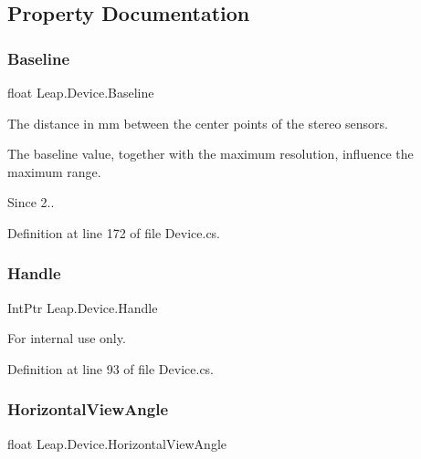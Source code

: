 \subsection{Property Documentation}
\mbox{\label{class_leap_1_1_device_a94d74a3c07a217a1aca1e4c88852f546}} 
\subsubsection{\texorpdfstring{Baseline}{Baseline}}
{\footnotesize\ttfamily float Leap.\+Device.\+Baseline\hspace{0.3cm}{\ttfamily [get]}}



The distance in mm between the center points of the stereo sensors. 

The baseline value, together with the maximum resolution, influence the maximum range.

\begin{DoxySince}{Since}
2.. 
\end{DoxySince}


Definition at line 172 of file Device.\+cs.

\mbox{\label{class_leap_1_1_device_ab09f55eeeb8cb9eac332cda57b3ece46}} 
\subsubsection{\texorpdfstring{Handle}{Handle}}
{\footnotesize\ttfamily Int\+Ptr Leap.\+Device.\+Handle\hspace{0.3cm}{\ttfamily [get]}}



For internal use only. 



Definition at line 93 of file Device.\+cs.

\mbox{\label{class_leap_1_1_device_aed0377f4ce57d410cc561e76a05cd3c0}} 
\subsubsection{\texorpdfstring{HorizontalViewAngle}{HorizontalViewAngle}}
{\footnotesize\ttfamily float Leap.\+Device.\+Horizontal\+View\+Angle\hspace{0.3cm}{\ttfamily [get]}}



